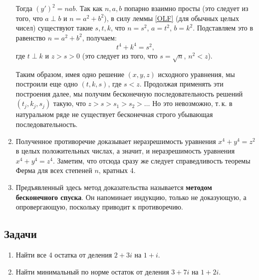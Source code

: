 \begin{enumerate}
Тогда $(y')^2=nab$. Так как $n,a,b$ попарно взаимно просты (это следует из того, что $a\perp b$ и $n=a^2+b^2$), в силу леммы \ref{OLF} (для обычных целых чисел) существуют такие $s,t,k$, что $n=s^2$, $a=t^2$, $b=k^2$. Подставляем это в равенство $n=a^2+b^2$, получаем:
$$
t^4+k^4=s^2,
$$
где $t\perp k$ и $z>s>0$ (это следует из того, что $s=\sqrt n$, $n^2<z$). 

Таким образом, имея одно решение $(x,y,z)$ исходного уравнения, мы построили еще одно $(t,k,s)$, где $s<z$. Продолжая применять эти построения далее, мы получим бесконечную последовательность решений $(t_j,k_j,s_j)$ такую, что $z>s>s_1>s_2>\dots$ Но это невозможно, т.\,к. в натуральном ряде не существует бесконечная строго убывающая последовательность.

\item Полученное противоречие доказывает неразрешимость уравнения $x^4+y^4=z^2$ в целых положительных числах, а значит, и неразрешимость уравнения $x^4+y^4=z^4$. Заметим, что отсюда сразу же следует справедливость теоремы Ферма для всех степеней $n$, кратных 4.

\item Предъявленный здесь метод доказательства называется \textbf{методом бесконечного спуска}. Он напоминает индукцию, только не доказующую, а опровергающую, поскольку приводит к противоречию.

\end{enumerate}



\subsection*{Задачи}
\begin{enumerate}
\item Найти все 4 остатка от деления $2+3i$ на $1+i$.
\item Найти минимальный по норме остаток от деления $3+7i$ на $1+2i$.
\end{enumerate}

